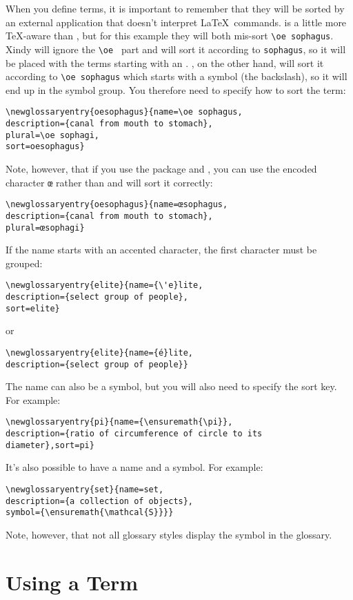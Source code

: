 \documentclass{nlctdoc}
\begin{document}
When you define terms, it is important to remember that they will
be sorted by an external application that doesn't interpret \LaTeX\
commands.  is a little more \TeX-aware than , but
for this example they will both mis-sort \verb|\oe sophagus|.
Xindy will ignore the \verb*|\oe | part and will sort it according
to \texttt{sophagus}, so it will be placed with the terms starting
with an \qt{s}. \app{Makeindex}, on the other hand, will sort it according
to \verb*|\oe sophagus| which starts with a symbol (the backslash),
so it will end up in the symbol group. You therefore need to 
specify how to sort the term:
\begin{verbatim}
\newglossaryentry{oesophagus}{name=\oe sophagus,
description={canal from mouth to stomach},
plural=\oe sophagi,
sort=oesophagus}
\end{verbatim}
Note, however, that if you use the  package and
, you can use the encoded character \texttt{œ} rather than
\cs{oe} and \app{xindy} will sort it correctly:
\begin{verbatim}
\newglossaryentry{oesophagus}{name=œsophagus,
description={canal from mouth to stomach},
plural=œsophagi}
\end{verbatim}

If the name starts with an accented character, the first character
must be grouped:
\begin{verbatim}
\newglossaryentry{elite}{name={\'e}lite,
description={select group of people},
sort=elite}
\end{verbatim}
or
\begin{verbatim}
\newglossaryentry{elite}{name={é}lite,
description={select group of people}}
\end{verbatim}

The name can also be a symbol, but you will also need to specify
the sort key. For example:
\begin{verbatim}
\newglossaryentry{pi}{name={\ensuremath{\pi}},
description={ratio of circumference of circle to its 
diameter},sort=pi}
\end{verbatim}
It's also possible to have a name and a symbol. For example:
\begin{verbatim}
\newglossaryentry{set}{name=set,
description={a collection of objects},
symbol={\ensuremath{\mathcal{S}}}}
\end{verbatim}
Note, however, that not all glossary styles display the symbol
in the glossary.

\section{Using a Term}
\label{usingterm}
\end{document}
